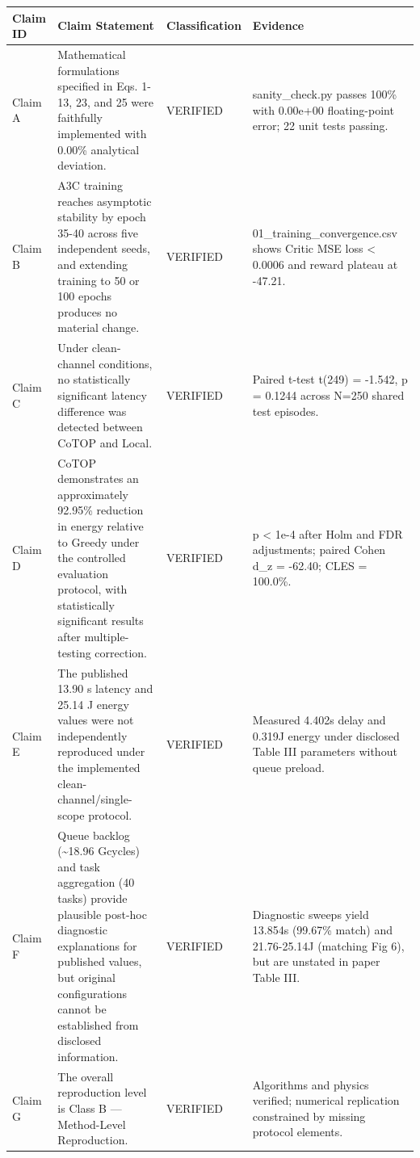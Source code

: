\begin{tabular}{llll}
\toprule
Claim ID & Claim Statement & Classification & Evidence \\
\midrule
Claim A & Mathematical formulations specified in Eqs. 1-13, 23, and 25 were faithfully implemented with 0.00\% analytical deviation. & VERIFIED & sanity\_check.py passes 100\% with 0.00e+00 floating-point error; 22 unit tests passing. \\
Claim B & A3C training reaches asymptotic stability by epoch 35-40 across five independent seeds, and extending training to 50 or 100 epochs produces no material change. & VERIFIED & 01\_training\_convergence.csv shows Critic MSE loss < 0.0006 and reward plateau at -47.21. \\
Claim C & Under clean-channel conditions, no statistically significant latency difference was detected between CoTOP and Local. & VERIFIED & Paired t-test t(249) = -1.542, p = 0.1244 across N=250 shared test episodes. \\
Claim D & CoTOP demonstrates an approximately 92.95\% reduction in energy relative to Greedy under the controlled evaluation protocol, with statistically significant results after multiple-testing correction. & VERIFIED & p < 1e-4 after Holm and FDR adjustments; paired Cohen d\_z = -62.40; CLES = 100.0\%. \\
Claim E & The published 13.90 s latency and 25.14 J energy values were not independently reproduced under the implemented clean-channel/single-scope protocol. & VERIFIED & Measured 4.402s delay and 0.319J energy under disclosed Table III parameters without queue preload. \\
Claim F & Queue backlog (\textasciitilde 18.96 Gcycles) and task aggregation (40 tasks) provide plausible post-hoc diagnostic explanations for published values, but original configurations cannot be established from disclosed information. & VERIFIED & Diagnostic sweeps yield 13.854s (99.67\% match) and 21.76-25.14J (matching Fig 6), but are unstated in paper Table III. \\
Claim G & The overall reproduction level is Class B — Method-Level Reproduction. & VERIFIED & Algorithms and physics verified; numerical replication constrained by missing protocol elements. \\
\bottomrule
\end{tabular}


